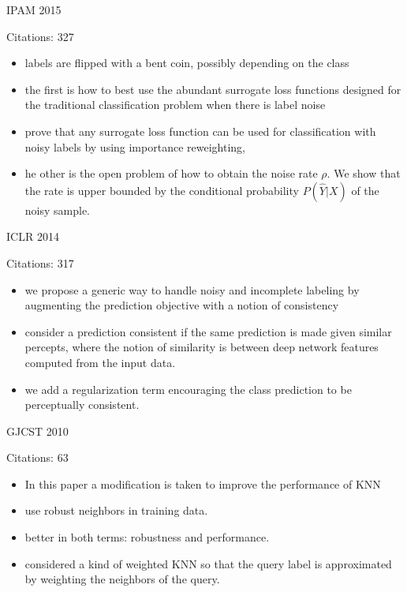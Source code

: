 \documentclass[11pt]{article}
\begin{document}
\noindent IPAM 2015

\noindent Citations: 327

\begin{itemize}
\item labels are flipped with a bent coin, possibly depending on the class
\item the first is how to best use the abundant surrogate loss functions designed for the traditional classification problem when there is label noise
\item  prove that any surrogate loss function can be used for classification with noisy labels by using importance reweighting,
\item he other is the open problem of how to obtain the noise rate $\rho$. We show that the rate is upper bounded by the conditional probability $P(\hat{Y} |X)$ of the noisy sample.
\end{itemize}

\vspace{2cm}

\noindent ICLR 2014

\noindent Citations: 317

\begin{itemize}
\item we propose a generic way to handle noisy and incomplete labeling by augmenting the prediction objective with a notion of consistency
\item consider a prediction consistent if the same prediction is made given similar percepts, where the notion of similarity is between deep network features computed from the input data.
\item we add a regularization term encouraging the class prediction to be perceptually consistent.
\end{itemize}

\vspace{2cm}

\noindent GJCST 2010

\noindent Citations: 63

\begin{itemize}
\item In this paper a modification is taken to improve the performance of KNN
\item use robust neighbors in training data.
\item better in both terms: robustness and performance.
\item considered a kind of weighted KNN so that the query label is approximated by weighting the neighbors of the query.
\end{itemize}
\end{document}
